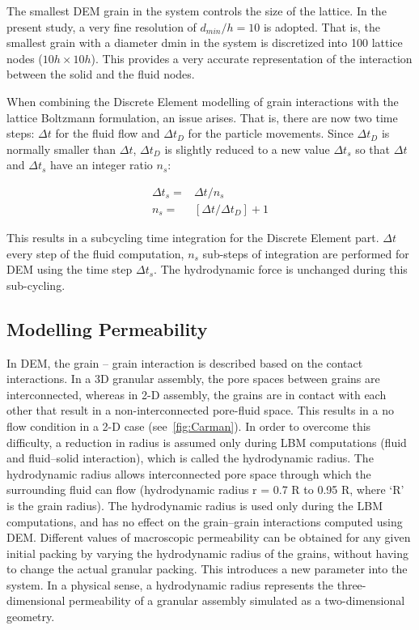\documentclass[12pt,twoside]{tuhhproc-en}
\begin{document}
The smallest DEM grain in the system controls the size of the lattice. In the present study, a very fine resolution of $d_{min}/h = 10$ is adopted. That is, the smallest grain with a diameter dmin in the system is discretized into 100 lattice nodes ($10h \times 10h$). This provides a very accurate representation of the interaction between the solid and the fluid nodes. 

When combining the Discrete Element modelling of grain interactions with the lattice Boltzmann formulation, an issue arises. That is, there are now two time steps: $\Delta t$ for the fluid flow and $\Delta t_D$ for the particle movements. Since $\Delta t_D$ is normally smaller than $\Delta t$, $\Delta t_D$ is slightly reduced to a new value $\Delta t_s$ so that $\Delta t$ and $\Delta t_s$ have an integer ratio $n_s$:

\begin{align}
  \Delta t_s = & \Delta t / n_s \\
  n_s  = & [\Delta t/\Delta t_D]+1
\end{align}

This results in a subcycling time integration for the Discrete Element part.  $\Delta t$ every step of the fluid computation, $n_s$ sub-steps of integration are performed for DEM using the time step  $\Delta t_s$. The hydrodynamic force is unchanged during this sub-cycling.

\subsection{Modelling Permeability}
In DEM, the grain -- grain interaction is described based on the contact interactions. In a 3D granular assembly, the pore spaces between grains are interconnected, whereas in 2-D assembly, the grains are in contact with each other that result in a non-interconnected pore-fluid space. This results in a no flow condition in a 2-D case (see~\cref{fig:Carman}). In order to overcome this difficulty, a reduction in radius is assumed only during LBM computations (fluid and fluid--solid interaction), which is called the hydrodynamic radius. The hydrodynamic radius allows interconnected pore space through which the surrounding fluid can flow (hydrodynamic radius r = 0.7 R to 0.95 R, where `R' is the grain radius). The hydrodynamic radius is used only during the LBM computations, and has no effect on the grain--grain interactions computed using DEM.  Different values of macroscopic permeability can be obtained for any given initial packing by varying the hydrodynamic radius of the grains, without having to change the actual granular packing. This introduces a new parameter into the system. In a physical sense, a hydrodynamic radius represents the three-dimensional permeability of a granular assembly simulated as a two-dimensional geometry.
\end{document}
